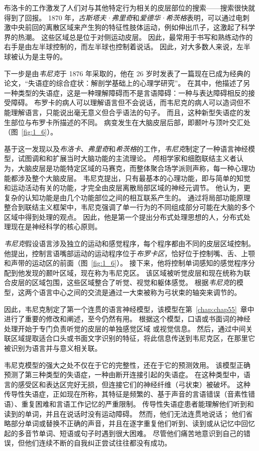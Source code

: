 布洛卡的工作激发了人们对与其他特定行为相关的皮层部位的搜索——搜索很快就得到了回报。
1870 年，\textit{古斯塔夫·弗里奇}和\textit{爱德华·希茨格}表明，可以通过电刺激中央前回的离散区域来产生狗的特征性肢体运动，例如伸出爪子，这激起了科学界的热潮。
这些区域总是位于对侧运动皮层。
因此，最常用于书写和熟练动作的右手是由左半球控制的，而左半球也控制着说话。
因此，对大多数人来说，左半球被认为是主导的。


下一步是由\textit{韦尼克}于 1876 年采取的，他在 26 岁时发表了一篇现在已成为经典的论文，“失语症的综合症状：解剖学基础上的心理学研究”。
在其中，他描述了另一种类型的失语症，这是一种理解障碍而不是言语障碍：一种与表达障碍相反的接受障碍。
布罗卡的病人可以理解语言但不会说话，而韦尼克的病人可以造词但不能理解语言，只能说出毫无意义但合乎语法的句子。
而且，这种新型失语症的发生部位与布罗卡所描述的不同。
病变发生在大脑皮层后部，即颞叶与顶叶交汇处（图~\ref{fig:1_6}）。


基于这一发现以及\textit{布洛卡}、\textit{弗里奇}和\textit{希茨格}的工作，\textit{韦尼克}制定了一种语言神经模型，试图调和和扩展当时大脑功能的主流理论。
颅相学家和细胞联结主义者认为，大脑皮层是功能特定区域的马赛克，而整体聚合场学派则声称，每一种心理功能都涉及整个大脑皮层。
韦尼克提出，只有最基本的心理功能，即与简单的知觉和运动活动有关的功能，才完全由皮层离散局部区域的神经元调节。
他认为，更复杂的认知功能是由几个功能部位之间的相互联系产生的。
通过将局部功能原理整合到联结主义框架中，韦尼克强调了单一行为的不同组成部分可能在大脑的多个区域中得到处理的观点。
因此，他是第一个提出分布式处理思想的人，分布式处理现在是神经科学的核心原则。


\textit{韦尼克}假设语言涉及独立的运动和感觉程序，每个程序都由不同的皮层区域控制。
他提出，控制言语嘴部运动的运动程序位于\textit{布罗卡区}，恰好位于控制嘴、舌、上颚和声带的运动区的前面（图~\ref{fig:1_6}）。
接下来，他将控制单词感知的感觉程序分配到他发现的颞叶区域，现在称为韦尼克区。
该区域被听觉皮层和现在统称为联合皮层的区域包围，这些区域整合了听觉、视觉和躯体感觉。
根据\textit{韦尼克}的模型，这两个语言中心之间的交流是通过一大束被称为弓状束的轴突来调节的。


因此，韦尼克制定了第一个连贯的语言神经模型，该模型在第~\ref{chap:chap55}~章中进行了重要的修改和阐述，至今仍然有用。
根据这个模型，口语或书面词的神经处理开始于专门负责听觉的皮层的单独感觉区域 或视觉信息。
然后，通过中间关联区域提取适合口头或书面文字识别的特征，将此信息传送到韦尼克区，在那里它被识别为语言并与意义相关联。


韦尼克模型的强大之处不仅在于它的完整性，还在于它的预测效用。
该模型正确预测了第三种类型的失语症，一种由断开连接引起的失语症。
在这种类型中，语言的感受区和表达区完好无损，但连接它们的神经纤维（弓状束）被破坏。
这种传导性失语症，正如现在所称，其特征是频繁的、基于声音的言语错误（音素性错语）、重复困难和言语工作记忆的严重限制。
传导性失语症患者能理解他们听到和读到的单词，并且在说话时没有运动障碍。
然而，他们无法连贯地说话； 他们省略部分单词或替换不正确的声音，并且在逐字重复他们听到、读到或从记忆中回忆起的多音节单词、短语或句子时遇到很大困难。
尽管他们痛苦地意识到自己的错误，但他们连续不断的自我纠正尝试往往都没有成功。


